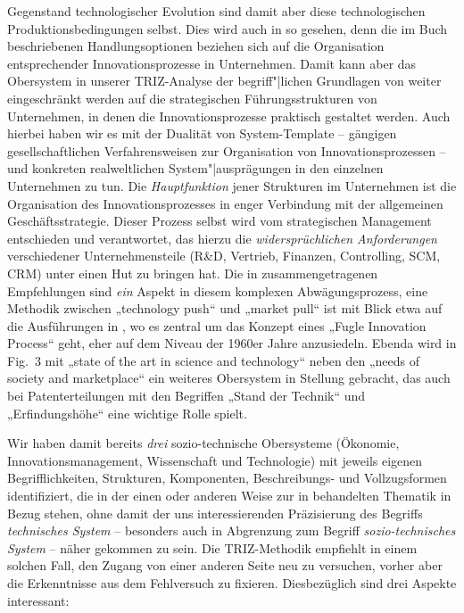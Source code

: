 \documentclass[11pt,a4paper]{article}
\begin{document}
Gegenstand technologischer Evolution sind damit aber diese technologischen
Produktionsbedingungen selbst. Dies wird auch in \cite{TESE2018} so gesehen,
denn die im Buch beschriebenen Handlungsoptionen beziehen sich auf die
Organisation entsprechender Innovationsprozesse in Unternehmen. Damit kann
aber das Obersystem in unserer TRIZ-Analyse der begriff"|lichen Grundlagen von
\cite{TESE2018} weiter eingeschränkt werden auf die strategischen
Führungsstrukturen von Unternehmen, in denen die Innovationsprozesse praktisch
gestaltet werden. Auch hierbei haben wir es mit der Dualität von
System-Template -- gängigen gesellschaftlichen Verfahrensweisen zur
Organisation von Innovationsprozessen -- und konkreten realweltlichen
System"|ausprägungen in den einzelnen Unternehmen zu tun. Die
\emph{Hauptfunktion} jener Strukturen im Unternehmen ist die Organisation des
Innovationsprozesses in enger Verbindung mit der allgemeinen
Geschäftsstrategie.  Dieser Prozess selbst wird vom strategischen Management
entschieden und verantwortet, das hierzu die \emph{widersprüchlichen
  Anforderungen} verschiedener Unternehmensteile (R\&D, Vertrieb, Finanzen,
Controlling, SCM, CRM) unter einen Hut zu bringen hat. Die in \cite{TESE2018}
zusammengetragenen Empfehlungen sind \emph{ein} Aspekt in diesem komplexen
Abwägungsprozess, eine Methodik zwischen „technology push“ und „market pull“
ist mit Blick etwa auf die Ausführungen in \cite{Preez2006}, wo es zentral um
das Konzept eines „Fugle Innovation Process“ geht, eher auf dem Niveau der
1960er Jahre anzusiedeln. Ebenda wird in Fig.~3 mit „state of the art in
science and technology“ neben den „needs of society and marketplace“ ein
weiteres Obersystem in Stellung gebracht, das auch  bei Patenterteilungen mit
den Begriffen „Stand der Technik“ und „Erfindungshöhe“ eine wichtige Rolle
spielt.

Wir haben damit bereits \emph{drei} sozio-technische Obersysteme (Ökonomie,
Innovationsmanagement, Wissenschaft und Technologie) mit jeweils eigenen
Begrifflichkeiten, Strukturen, Komponenten, Beschreibungs- und Vollzugsformen
identifiziert, die in der einen oder anderen Weise zur in \cite{TESE2018}
behandelten Thematik in Bezug stehen, ohne damit der uns interessierenden
Präzisierung des Begriffs \emph{technisches System} -- besonders auch in
Abgrenzung zum Begriff \emph{sozio-technisches System} -- näher gekommen zu
sein. Die TRIZ-Methodik empfiehlt in einem solchen Fall, den Zugang von einer
anderen Seite neu zu versuchen, vorher aber die Erkenntnisse aus dem
Fehlversuch zu fixieren.  Diesbezüglich sind drei Aspekte interessant:
\end{document}
